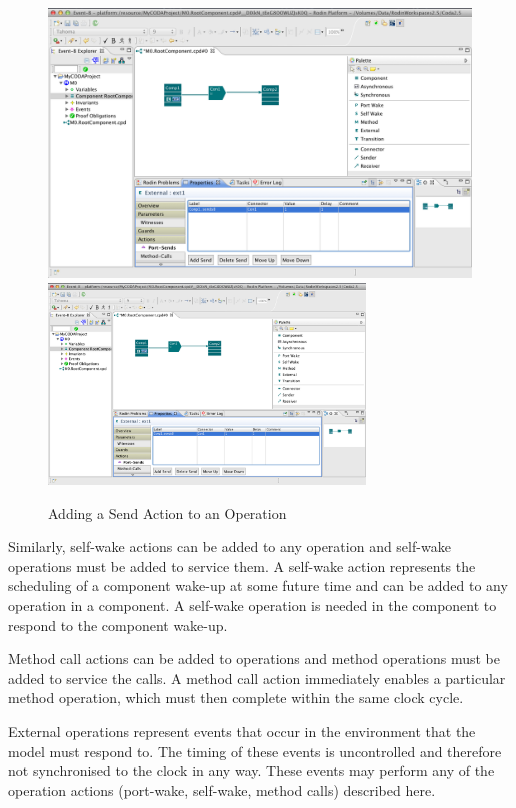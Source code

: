 \begin{figure}[!htbp]
  \centering
  \ifplastex
  \includegraphics[width=768]{figures/image7.png}
  \else
  \includegraphics[width=0.75\textwidth]{figures/image7.png}
  \fi
  \caption{Adding a Send Action to an Operation}
  \label{fig:AddingaSendActiontoanOperation}
\end{figure}
 
 
Similarly, self-wake actions can be added to any operation and self-wake operations must be added to service them. A self-wake action represents the scheduling of a component wake-up at some future time and can be added to any operation in a component. A self-wake operation is needed in the component to respond to the component wake-up. 


Method call actions can be added to operations and method operations must be added to service the calls. A method call action immediately enables a particular method operation, which must then complete within the same clock cycle.


External operations represent events that occur in the environment that the model must respond to. The timing of these events is uncontrolled and therefore not synchronised to the clock in any way. These events may perform any of the operation actions (port-wake, self-wake, method calls) described here.


